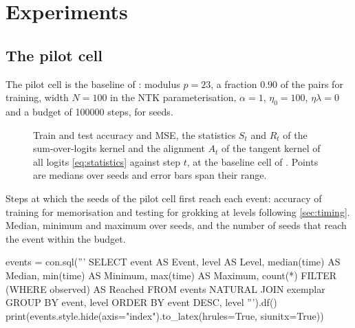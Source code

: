 \documentclass[a4paper,11pt]{article} %
\begin{document}
\section{Experiments}

\subsection{The pilot cell}\label{sec:pilot}

The pilot cell is the baseline of \citet{kumarGrokkingTransitionLazy2024}: modulus $p=23$,
a fraction $0.90$ of the pairs for training, width $N=100$ in the NTK parameterisation,
$\alpha=1$, $\eta_0=100$, $\eta\lambda=0$ and a budget of \num{100000} steps, for {\color{blue}} seeds.

\begin{figure}[H]
  \centering
{}
  \caption{Train and test accuracy and MSE, the statistics $S_t$ and $R_t$ of the
    sum-over-logits kernel and the alignment $A_t$ of the tangent kernel of all logits
    \eqref{eq:statistics} against step $t$, at the baseline cell of
    \citet{kumarGrokkingTransitionLazy2024}. Points are medians over
  {\color{blue}} seeds and error bars span their range.}
  \label{fig:dynamics}
\end{figure}

\begin{table}[H]
  \centering
  \caption{Steps at which the seeds of the pilot cell first reach each event:
    accuracy of training for memorisation and testing for grokking at levels following \cref{sec:timing}.
    Median, minimum and maximum over seeds, and the number of seeds that
    reach the event within the budget.}
  \label{tab:events}
\begin{pycode}
events = con.sql('''
    SELECT event AS Event, level AS Level, median(time) AS Median,
        min(time) AS Minimum, max(time) AS Maximum,
        count(*) FILTER (WHERE observed) AS Reached
    FROM events NATURAL JOIN exemplar
    GROUP BY event, level
    ORDER BY event DESC, level
''').df()
print(events.style.hide(axis="index").to_latex(hrules=True, siunitx=True))
\end{pycode}
\end{table}
\end{document}
